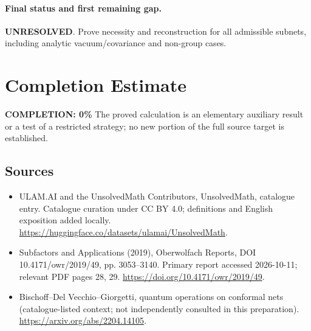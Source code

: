 \documentclass[11pt]{article}
\begin{document}
\paragraph{Final status and first remaining gap.}
\textbf{UNRESOLVED}. Prove necessity and reconstruction for all admissible subnets, including analytic vacuum/covariance and non-group cases.

\section{Completion Estimate}
\noindent\textbf{COMPLETION: 0\%}
The proved calculation is an elementary auxiliary result or a test of a restricted strategy; no new portion of the full source target is established.

\subsection{Sources}
\begin{itemize}
\item[\hypertarget{source:statement:1}{S1}] ULAM.AI and the UnsolvedMath Contributors, UnsolvedMath, catalogue entry. Catalogue curation under CC BY 4.0; definitions and English exposition added locally.
\url{https://huggingface.co/datasets/ulamai/UnsolvedMath}.
\item[\hypertarget{source:statement:2}{S2}] Subfactors and Applications (2019), Oberwolfach Reports, DOI 10.4171/owr/2019/49, pp. 3053--3140. Primary report accessed 2026-10-11; relevant PDF pages 28, 29.
\url{https://doi.org/10.4171/owr/2019/49}.
\item[\hypertarget{source:statement:3}{S3}] Bischoff--Del Vecchio--Giorgetti, quantum operations on conformal nets (catalogue-listed context; not independently consulted in this preparation).
\url{https://arxiv.org/abs/2204.14105}.
\end{itemize}
\label{end:statement}
\end{document}
